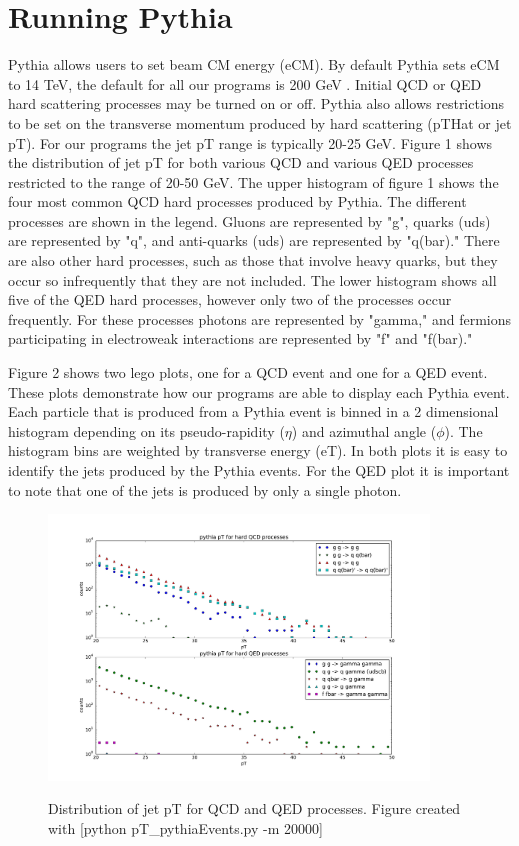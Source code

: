 \documentclass[11pt]{article}
\begin{document}
\section{Running Pythia}
%
%
Pythia allows users to set beam CM energy (eCM). By default Pythia sets eCM to 14 TeV, the default for all our programs is 200 GeV .  Initial QCD or QED hard scattering processes may be turned on or off. Pythia also allows restrictions to be set on the transverse momentum produced by hard scattering (pTHat or jet pT). For our programs the jet pT range is typically 20-25 GeV. Figure 1 shows the distribution of jet pT for both various QCD and various QED processes restricted to the range of 20-50 GeV. The upper histogram of figure 1 shows the four most common QCD hard processes produced by Pythia. The different processes are shown in the legend. Gluons are represented by "g", quarks (uds) are represented by "q", and anti-quarks (uds) are represented by "q(bar)." There are also other hard processes, such as those that involve heavy quarks, but they occur so infrequently that they are not included. The lower histogram shows all five of the QED hard processes, however only two of the processes occur frequently. For these processes photons are represented by "gamma," and fermions participating in electroweak interactions are represented by "f" and "f(bar)."

Figure 2 shows two lego plots, one for a QCD event and one for a QED event. These plots demonstrate how our programs are able to display each Pythia event. Each particle that is produced from a Pythia event is binned in a 2 dimensional histogram depending on its pseudo-rapidity ($\eta$) and azimuthal angle ($\phi$). The histogram bins are weighted by transverse energy (eT). In both plots it is easy to identify the jets produced by the Pythia events. For the QED plot it is important to note that one of the jets is produced by only a single photon. 

\begin{figure}[h]
\begin{center}
\includegraphics[width=0.9\textwidth]{pT_pythiaEvents.pdf}
\label{fig_label}
\caption{Distribution of jet pT for QCD and QED processes.  Figure created with [python pT\_pythiaEvents.py -m 20000]}
\end{center}
\end{figure}
\end{document}
